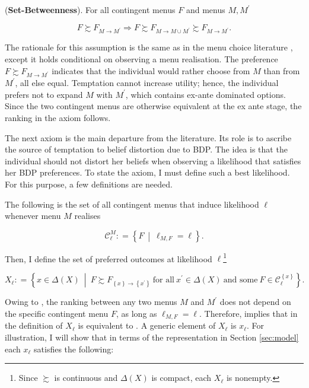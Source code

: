 \begin{axiom}\label{ax:betweenness}

	(\textbf{Set-Betweenness}). For all contingent menus \( F \) and menus \( M, M^{\prime} \)

	\[
		F  \succsim F_{M \rightarrow M^{\prime}} \Rightarrow F  \succsim F_{M \rightarrow M \cup M^{\prime}} \succsim F_{M \rightarrow M^{\prime}} .
	\]

\end{axiom}

The rationale for this assumption is the same as in the menu choice literature \citep{gulTemptationSelfControl2001}, except it holds conditional on observing a menu realisation. The preference \( F \succsim F_{M \rightarrow M^{\prime}} \) indicates that the individual would rather choose from \( M \) than from \( M^{\prime} \), all else equal. Temptation cannot increase utility; hence, the individual prefers not to expand \( M \) with \( M^{\prime} \), which contains ex-ante dominated options. Since the two contingent menus are otherwise equivalent at the ex ante stage, the ranking in the axiom follows.

The next axiom is the main departure from the literature. Its role is to ascribe the source of temptation to belief distortion due to BDP. The idea is that the individual should not distort her beliefs when observing a likelihood that satisfies her BDP preferences. To state the axiom, I must define such a best likelihood. For this purpose, a few definitions are needed.

The following is the set of all contingent menus that induce likelihood \( \ell \) whenever menu \( M \) realises

\[
	\mathcal{C}^{M}_{\ell} : = \left\{ F \: \middle\vert \: \ell_{M,F} = \ell \right\} .
\]

Then, I define the set of preferred outcomes at likelihood \( \ell \)\footnote{Since \( \succsim \) is continuous and \( \Delta \left( X \right) \) is compact, each \( X_{\ell} \) is nonempty.}

\[
	X_{\ell} : = \left\{ x \in \Delta \left( X \right) \: \middle\vert  \: F \succsim F_{ \left\{ x  \right\} \rightarrow \left\{ x^{\prime} \right\} }  \: \text{for all} \: x^{\prime} \in \Delta \left( X \right) \: \text{and some} \: F \in \mathcal{C}^{\left\{ x \right\} }_{\ell} \right\} .
\]

Owing to , the ranking between any two menus \( M \) and \( M^{\prime} \) does not depend on the specific contingent menu \( F \), as long as \( \ell_{M, F} = \ell \). Therefore,  implies that  in the definition of \( X_{\ell} \) is equivalent to . A generic element of \( X_{\ell} \) is \( x_{\ell} \). For illustration, I will show that in terms of the representation in Section \ref{sec:model} each \( x_{\ell} \) satisfies the following:

